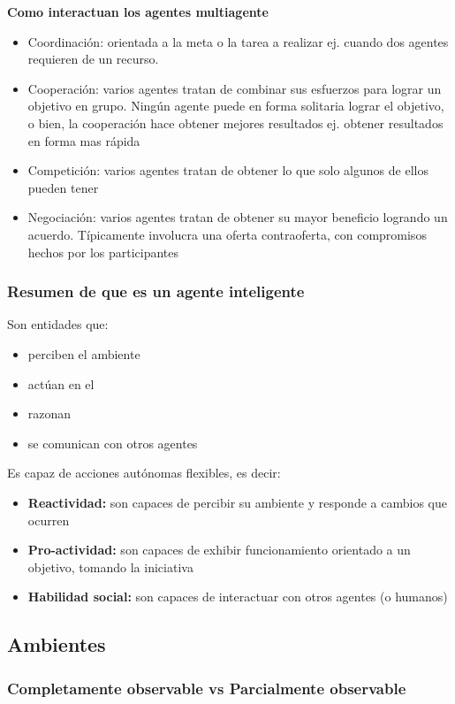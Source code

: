 \textbf{Como interactuan los agentes multiagente}
\begin{itemize}
  \item Coordinación: orientada a la meta o la tarea a realizar ej. cuando dos agentes requieren de un recurso.
  \item Cooperación: varios agentes tratan de combinar sus esfuerzos para lograr un objetivo en grupo. Ningún agente puede en forma solitaria lograr el objetivo, o bien, la cooperación hace obtener mejores resultados ej. obtener resultados en forma mas rápida
  \item Competición: varios agentes tratan de obtener lo que solo algunos de ellos pueden tener
  \item Negociación: varios agentes tratan de obtener su mayor beneficio logrando un acuerdo. Típicamente involucra una oferta contraoferta, con compromisos hechos por los participantes 
\end{itemize}

\subsubsection*{Resumen de que es un agente inteligente}
Son entidades que:
\begin{itemize}
  \item perciben el ambiente
  \item actúan en el
  \item razonan
  \item se comunican con otros agentes
\end{itemize}
Es capaz de acciones autónomas flexibles, es decir:
\begin{itemize}
  \item \textbf{Reactividad: }son capaces de percibir su ambiente y responde a cambios que ocurren
  \item \textbf{Pro-actividad: }son capaces de exhibir funcionamiento orientado a un objetivo, tomando la iniciativa
  \item \textbf{Habilidad social: }son capaces de interactuar con otros agentes (o humanos)
\end{itemize}

\subsection*{Ambientes}
\subsubsection*{Completamente observable vs Parcialmente observable}

